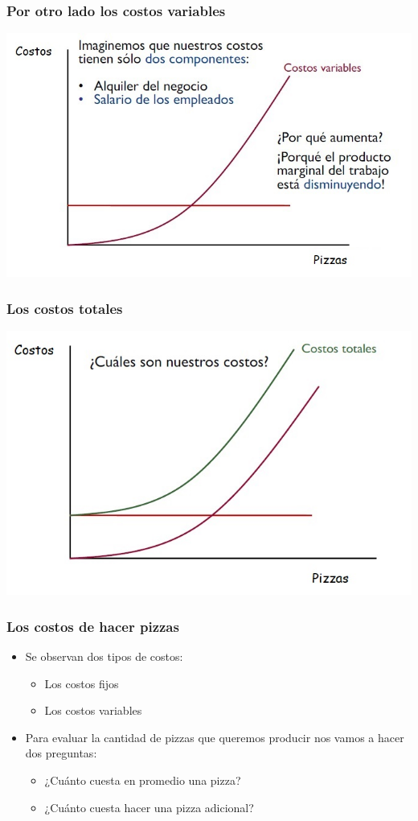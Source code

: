 \documentclass{beamer}
\begin{document}
\begin{frame}
\frametitle{ Por otro lado los costos variables}
\centering
\includegraphics[scale=0.6]{Figures/Tema_06.18.jpg}
\end{frame}

\begin{frame}
\frametitle{ Los costos totales}
\centering
\includegraphics[scale=0.6]{Figures/Tema_06.19.jpg}
\end{frame}

\begin{frame}
\frametitle{ Los costos de hacer pizzas}
\begin{itemize}
    \item Se observan dos tipos de costos: 
        \begin{itemize}
        \item Los costos fijos
        \item Los costos variables
        \end{itemize}
    \vspace{2mm}
    \item Para evaluar la cantidad de pizzas que queremos producir nos vamos a hacer dos preguntas:
        \begin{itemize}
        \item ¿Cuánto cuesta en promedio una pizza?
        \item ¿Cuánto cuesta hacer una pizza adicional?
        \end{itemize}
\end{itemize}
\end{frame}
\end{document}
